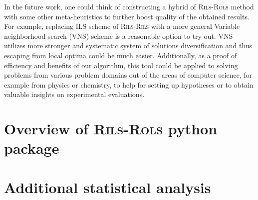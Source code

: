 \documentclass[a4paper,12pt]{elsarticle}
\begin{document}
In the future work, one could think of constructing a hybrid of \textsc{Rils-Rols} method with some other meta-heuristics to further boost quality of the  obtained results. For example, replacing ILS scheme of \textsc{Rils-Rils} with  a more general Variable neighborhood search (VNS) scheme is a reasonable option to try out. VNS   utilizes more stronger and systematic system of solutions diversification  and thus   escaping from local optima could be much easier.  Additionally, as a proof of efficiency and benefits of our algorithm, this tool could  be applied to solving problems from various problem domains out of the areas of computer science, for example from physics or chemistry, to help for setting up hypotheses or to obtain valuable insights on   experimental evaluations.  

\newpage
\appendix

\section{Overview of \textsc{Rils}-\textsc{Rols}  python package}\label{sec:appendix-1}

\section{Additional statistical analysis}\label{sec:appendix-2}
\end{document}
